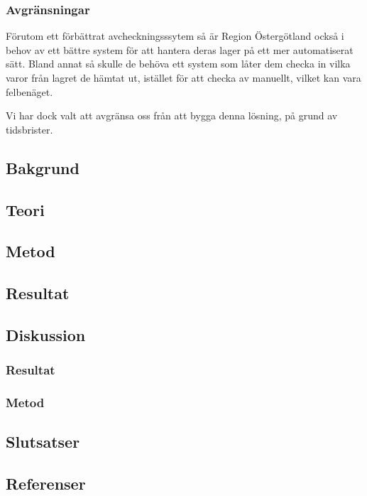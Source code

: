 \subsubsection{Avgränsningar}
Förutom ett förbättrat avcheckningsssytem så är Region Östergötland också i behov av
ett bättre system för att hantera deras lager på ett mer automatiserat sätt. %
Bland annat
så skulle de behöva ett system som låter dem checka in vilka varor från lagret de hämtat
ut, istället för att checka av manuellt, vilket kan vara felbenäget.

Vi har dock valt att avgränsa oss från att bygga denna lösning, på grund av tidsbrister.


\subsection{Bakgrund}


\subsection{Teori}

\subsection{Metod}
\subsection{Resultat}
\subsection{Diskussion}
\subsubsection{Resultat}
\subsubsection{Metod}
\subsection{Slutsatser}
\subsection{Referenser}
\vspace{-9mm}
\renewcommand{\refname}{}
\begin{thebibliography}{9}

\end{thebibliography}
